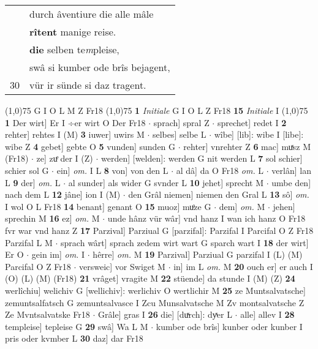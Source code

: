 \documentclass[8pt,a4paper,notitlepage]{article}
\begin{document}
\begin{table}[ht]
\begin{minipage}[t]{0.5\linewidth}
\begin{tabular}{rl}
 & durch âventiure die alle mâle\\ 
 & \textbf{rîtent} manige reise.\\ 
 & \textbf{die} selben te\textit{m}pleise,\\ 
 & swâ si kumber ode brîs bejagent,\\ 
30 & vür ir sünde si daz tragent.\\ 
\end{tabular}
\scriptsize
\line(1,0){75} \newline
G I O L M Z Fr18 \newline
\line(1,0){75} \newline
\textbf{1} \textit{Initiale} G I O L Z Fr18  \textbf{15} \textit{Initiale} I  \newline
\line(1,0){75} \newline
\textbf{1} Der wirt] Er I ÷er wirt O Der Fr18  $\cdot$ sprach] spral Z  $\cdot$ sprechet] redet I \textbf{2} rehter] rehtes I (M) \textbf{3} iuwer] uwirs M  $\cdot$ selbes] selbe L  $\cdot$ wîbe] [lib]: wibe I [libe]: wibe Z \textbf{4} gebet] gebte O \textbf{5} vunden] sunden G  $\cdot$ rehter] vnrehter Z \textbf{6} mac] muͯsz M (Fr18)  $\cdot$ ze] zuͤ der I (Z)  $\cdot$ werden] [welden]: werden G nit werden L \textbf{7} sol schier] schier sol G  $\cdot$ ein] \textit{om.} I L \textbf{8} von] von den L  $\cdot$ al dâ] da O Fr18 \textit{om.} L  $\cdot$ verlân] lan L \textbf{9} der] \textit{om.} L  $\cdot$ al sunder] als wider G svnder L \textbf{10} jehet] sprecht M  $\cdot$ umbe den] nach dem L \textbf{12} jâne] ion I (M)  $\cdot$ den Grâl niemen] niemen den Gral L \textbf{13} sô] \textit{om.} I wol O L Fr18 \textbf{14} benant] genant O \textbf{15} muoz] muͦze G  $\cdot$ dem] \textit{om.} M  $\cdot$ jehen] sprechin M \textbf{16} ez] \textit{om.} M  $\cdot$ unde hânz vür wâr] vnd hanz I wan ich hanz O Fr18 fvr war vnd hanz Z \textbf{17} Parzival] Parziual G [parzifal]: Parzifal I Parcifal O Z Fr18 Parzifal L M  $\cdot$ sprach wârt] sprach zedem wirt wart G sparch wart I \textbf{18} der wirt] Er O  $\cdot$ gein im] \textit{om.} I  $\cdot$ hêrre] \textit{om.} M \textbf{19} Parzival] Parziual G parzifal I (L) (M) Parcifal O Z Fr18  $\cdot$ versweic] vor Swiget M  $\cdot$ in] im L \textit{om.} M \textbf{20} ouch er] er auch I (O) (L) (M) (Fr18) \textbf{21} vrâget] vragite M \textbf{22} stüende] da stunde I (M) (Z) \textbf{24} werlîchiu] welichiv G [wellichiv]: werlichiv O wertlichir M \textbf{25} ze Muntsalvatsche] zemuntsalfatsch G zemuntsalvasce I Zcu Munsalvatsche M Zv montsalvatsche Z Ze Mvntsalvatske Fr18  $\cdot$ Grâle] gras I \textbf{26} die] [duͯrch]: dyͯer L  $\cdot$ alle] allev I \textbf{28} templeise] tepleise G \textbf{29} swâ] Wa L M  $\cdot$ kumber ode brîs] kunber oder kunber I pris oder kvmber L \textbf{30} daz] dar Fr18 \newline

\end{minipage}
\end{table}
\end{document}
